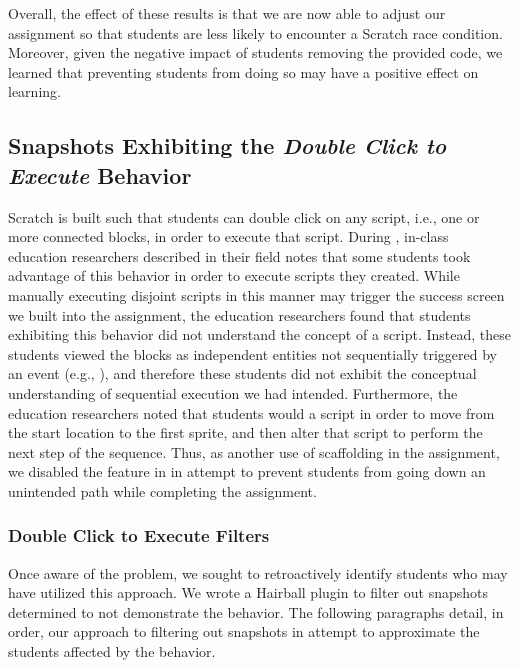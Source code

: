 Overall, the effect of these results is that we are now able to adjust our
assignment so that students are less likely to encounter a Scratch race
condition. Moreover, given the negative impact of students removing the
provided code, we learned that preventing students from doing so may have a
positive effect on learning.

\subsection{Snapshots Exhibiting the \emph{Double Click to Execute} Behavior}

Scratch is built such that students can double click on any script, i.e., one
or more connected blocks, in order to execute that script. During \sone{},
in-class education researchers described in their field notes that some
students took advantage of this behavior in order to execute scripts they
created. While manually executing disjoint scripts in this manner may trigger
the success screen we built into the assignment, the education researchers
found that students exhibiting this behavior did not understand the concept of
a script. Instead, these students viewed the blocks as independent entities not
sequentially triggered by an event (e.g., \netclicked{}), and therefore these
students did not exhibit the conceptual understanding of sequential execution
we had intended. Furthermore, the education researchers noted that students
would \dce{} a script in order to move from the start location to the first
sprite, and then alter that script to perform the next step of the
sequence. Thus, as another use of scaffolding in the assignment, we disabled
the \dce{} feature in \stwo{} in attempt to prevent students from going down an
unintended path while completing the assignment.

\subsubsection{Double Click to Execute Filters}
Once aware of the problem, we sought to retroactively identify students who may
have utilized this \dce{} approach. We wrote a Hairball plugin to filter out
snapshots determined to not demonstrate the \dce{} behavior. The following
paragraphs detail, in order, our approach to filtering out snapshots in attempt
to approximate the students affected by the \dce{} behavior.

